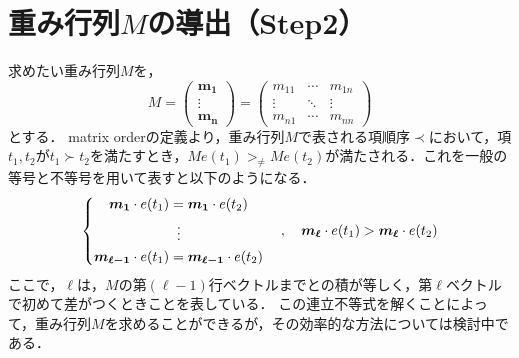 \section{重み行列$M$の導出（Step2）}
求めたい重み行列$M$を，
$$
	M = \begin{pmatrix}
		\bm{m_1} \\
		\vdots \\
		\bm{m_n}
	\end{pmatrix}
	=
	\begin{pmatrix}
		m_{11} & \cdots & m_{1n} \\
		\vdots & \ddots & \vdots \\
		m_{n1} & \cdots & m_{nn}
	\end{pmatrix}
$$
とする．
matrix orderの定義より，重み行列$M$で表される項順序$\prec$において，項$t_1, t_2$が$t_1 \succ t_2$を満たすとき，$Me(t_1) >_{\ne} Me(t_2)$が満たされる．これを一般の等号と不等号を用いて表すと以下のようになる．
\begin{equation}
	\left\{
	\begin{aligned}
		\bm{m_1} \cdot e(t_1) &= \bm{m_1} \cdot e(t_2)\\
		&\;\; \vdots \\
		\bm{m_{\ell-1}} \cdot e(t_1) &= \bm{m_{\ell-1}} \cdot e(t_2)
	\end{aligned}
	\right.
	\quad
	,
	\quad \bm{m_{\ell}} \cdot e(t_1)> \bm{m_{\ell}} \cdot e(t_2) \notag
\end{equation}
ここで，$\ell$は，$M$の第$(\ell-1)$行ベクトルまでとの積が等しく，第$\ell$ベクトルで初めて差がつくときことを表している．
この連立不等式を解くことによって，重み行列$M$を求めることができるが，その効率的な方法については検討中である．